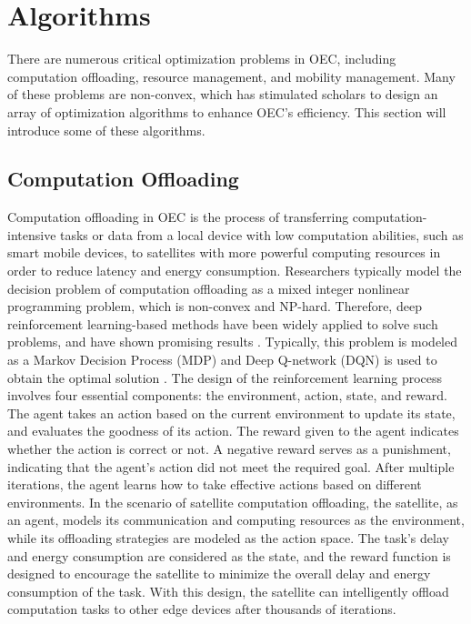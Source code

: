 \documentclass[lettersize,journal]{IEEEtran}
\begin{document}
\section{Algorithms}
\label{sec5}
There are numerous critical optimization problems in OEC, including computation offloading, resource management, and mobility management. Many of these problems are non-convex, which has stimulated scholars to design an array of optimization algorithms to enhance OEC's efficiency. This section will introduce some of these algorithms.

\subsection{Computation Offloading}
Computation offloading in OEC is the process of transferring computation-intensive tasks or data from a local device with low computation abilities, such as smart mobile devices, to satellites with more powerful computing resources in order to reduce latency and energy consumption. Researchers typically model the decision problem of computation offloading as a mixed integer nonlinear programming problem, which is non-convex and NP-hard. Therefore, deep reinforcement learning-based methods have been widely applied to solve such problems, and have shown promising results \cite{RN18, RN79}. Typically, this problem is modeled as a Markov Decision Process (MDP) and Deep Q-network (DQN) is used to obtain the optimal solution \cite{RN78}. The design of the reinforcement learning process involves four essential components: the environment, action, state, and reward. The agent takes an action based on the current environment to update its state, and evaluates the goodness of its action. The reward given to the agent indicates whether the action is correct or not. A negative reward serves as a punishment, indicating that the agent's action did not meet the required goal. After multiple iterations, the agent learns how to take effective actions based on different environments. In the scenario of satellite computation offloading, the satellite, as an agent, models its communication and computing resources as the environment, while its offloading strategies are modeled as the action space. The task's delay and energy consumption are considered as the state, and the reward function is designed to encourage the satellite to minimize the overall delay and energy consumption of the task. With this design, the satellite can intelligently offload computation tasks to other edge devices after thousands of iterations.
\end{document}
